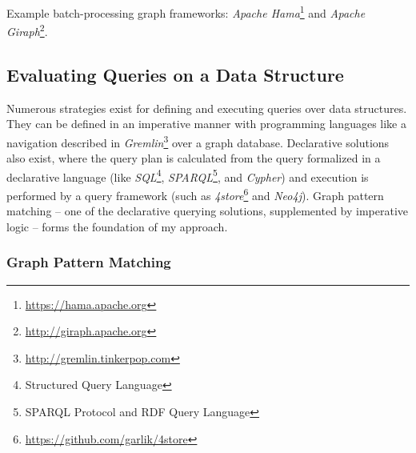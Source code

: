 Example batch-processing graph frameworks: \emph{Apache Hama}\footnote{\small\url{https://hama.apache.org}} and \emph{Apache Giraph}\footnote{\small\url{http://giraph.apache.org}}.

\subsection{Evaluating Queries on a Data Structure}
Numerous strategies exist for defining and executing queries over data structures. They can be defined in an imperative manner with programming languages like a navigation described in \emph{Gremlin}\footnote{\small\url{http://gremlin.tinkerpop.com}} over a graph database. Declarative solutions also exist, where the query plan is calculated from the query formalized in a declarative language (like \emph{SQL}\footnote{Structured Query Language}, \emph{SPARQL}\footnote{SPARQL Protocol and RDF Query Language}, and \emph{Cypher}) and execution is performed by a query framework (such as \emph{4store}\footnote{\small\url{https://github.com/garlik/4store}} and \emph{Neo4j}). Graph pattern matching -- one of the declarative querying solutions, supplemented by imperative logic -- forms the foundation of my approach.

\subsubsection{Graph Pattern Matching}

